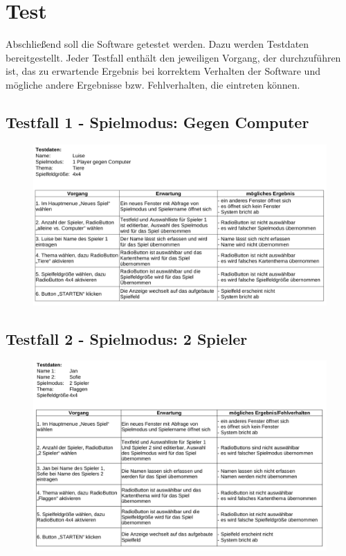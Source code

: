 \clearpage
\chapter{Test}
Abschließend soll die Software getestet werden. Dazu werden Testdaten bereitgestellt. Jeder Testfall enthält den jeweiligen Vorgang, der durchzuführen ist, das zu erwartende Ergebnis bei korrektem Verhalten der Software und mögliche andere Ergebnisse bzw. Fehlverhalten, die eintreten können.

\section{Testfall 1 - Spielmodus: Gegen Computer}
\begin{figure}[!h]
	\centering
    \includegraphics[width=15cm]{./Testfall1.png}
	\label{layout_gesamt}
\end{figure}

\clearpage
\section{Testfall 2 - Spielmodus: 2 Spieler}
\begin{figure}[!h]
	\centering
    \includegraphics[width=15cm]{./Testfall2.png}
	\label{layout_gesamt}
\end{figure}

